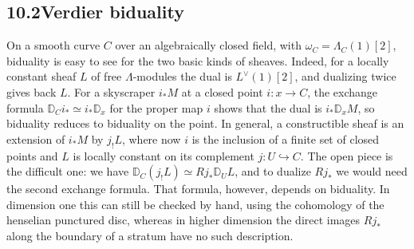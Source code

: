 \documentclass[11pt]{article}
\begin{document}
\subsection*{\texorpdfstring{10.2\quad Verdier biduality}{10.2 Verdier biduality}}
\label{bp112}%
\label{bp113}%
On a smooth curve \(C\) over an algebraically closed field, with \(\omega_C=\Lambda_C(1)[2]\), biduality is easy to see for the two basic kinds of sheaves. Indeed, for a locally constant sheaf \(L\) of free \(\Lambda\)-modules the dual is \(L^\vee(1)[2]\), and dualizing twice gives back \(L\). For a skyscraper \(i_*M\) at a closed point \(i:x\to C\), the exchange formula \(\mathbb D_Ci_*\simeq i_*\mathbb D_x\) for the proper map \(i\) shows that the dual is \(i_*\mathbb D_xM\), so biduality reduces to biduality on the point. In general, a constructible sheaf is an extension of \(i_*M\) by \(j_!L\), where now \(i\) is the inclusion of a finite set of closed points and \(L\) is locally constant on its complement \(j:U\hookrightarrow C\). The open piece is the difficult one: we have \(\mathbb D_C(j_!L)\simeq Rj_*\mathbb D_UL\), and to dualize \(Rj_*\) we would need the second exchange formula. That formula, however, depends on biduality. In dimension one this can still be checked by hand, using the cohomology of the henselian punctured disc, whereas in higher dimension the direct images \(Rj_*\) along the boundary of a stratum have no such description.
\end{document}
